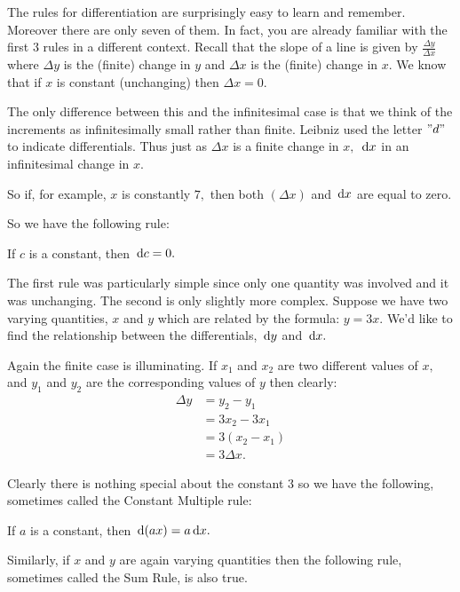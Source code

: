 The rules for differentiation are surprisingly easy to learn and
remember. Moreover there are only seven of them. 
In fact, you are already familiar with the first $3$ rules in a
different context. Recall that the slope of a line is given by
$\frac{\Delta y}{\Delta x}$ where $\Delta y$ is the (finite) change in
$y$ and $\Delta x$ is the (finite) change in $x.$ We know that  if $x$
is constant (unchanging) then
${\Delta x} =0.$

The only difference between this and the infinitesimal case is that we
think of the increments as infinitesimally small rather than
finite. Leibniz used the letter $"d"$ to indicate differentials. Thus
just as $\Delta x$ is a finite change in $x,$ $\thinspace{\rm d}x$ in an
infinitesimal change in $x.$

So if, for example, $x$ is constantly $7,$ then both 
$(\Delta x)$ and $\thinspace{\rm d}x$ are equal to zero.

So we have the following rule:

  If $c$ is a constant, then $\thinspace{\rm d}c=0.$

The first rule was particularly simple since only one quantity was
involved and it was unchanging. The second is only slightly more
complex. Suppose we have two varying quantities, $x$ and $y$ which are
related by the formula:
$y=3x.$ We'd like to find the relationship between the differentials,
$\thinspace{\rm d}y$ and $\thinspace{\rm d}x.$

Again the finite case is illuminating. If $x_1$ and $x_2$ are two
different values of $x,$ and $y_1$ and $y_2$ are the corresponding
values of $y$ then clearly:
\begin{align*}
  \Delta y &= y_2-y_1\\
           &= 3x_2-3x_1\\
           &= 3(x_2-x_1)\\
           &= 3\Delta x.
\end{align*}

Clearly there is nothing special about the constant $3$ so we have the
following, sometimes called the Constant Multiple rule:

  If $a$ is a constant, then $\thinspace{\rm d}(ax)=a\thinspace{\rm d}x.$ 

Similarly, if $x$ and $y$ are again varying quantities then the
following rule, sometimes called the Sum Rule, is also true.

